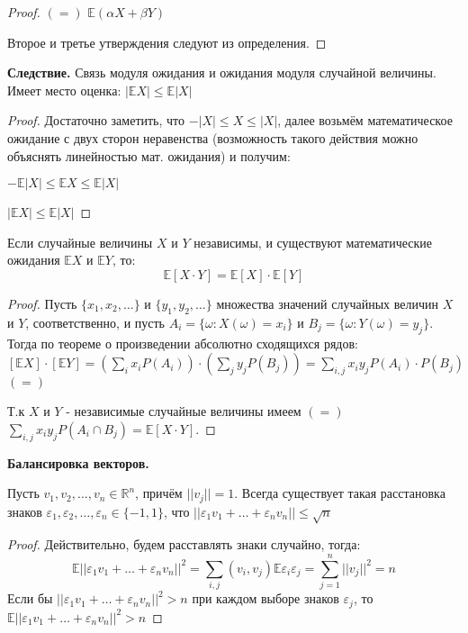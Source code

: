 \documentclass[a4paper]{article}
\begin{document}
\begin{colloq}
\begin{proof}
   		$(=)$ $\mathbb{E}(\alpha X + \beta Y)$
   		
   		Второе и третье утверждения следуют из определения.
   	\end{proof}
   	
   	\textbf{Следствие.} Связь модуля ожидания и ожидания модуля случайной величины. \\
   		Имеет место оценка: $|\mathbb{E}X| \leqslant \mathbb{E}|X|$
   	\begin{proof}
   		Достаточно заметить, что $-|X|\leqslant X \leqslant |X|$, далее возьмём математическое ожидание с двух сторон неравенства (возможность такого действия можно объяснять линейностью мат. ожидания) и получим:
   		 
   		$-\mathbb{E}|X| \leqslant \mathbb{E}X \leqslant \mathbb{E}|X|$
   		
		$|\mathbb{E}X| \leqslant \mathbb{E}|X|$
   	\end{proof}
   	
   	\begin{theorem*}
   		Если случайные величины $X$ и $Y$ независимы, и существуют математические ожидания $\mathbb{E}X$ и $\mathbb{E}Y$, то: \[ \mathbb{E}[X \cdot Y] = \mathbb{E}[X] \cdot \mathbb{E}[Y] \] 
   	\end{theorem*}
   	
   	\begin{proof}
   		Пусть $\{ x_1, x_2, \dots \}$ и $\{ y_1, y_2, \dots \}$ множества значений случайных величин $X$ и $Y$, соответственно, и пусть $A_i=\{ \omega: X(\omega)=x_i \}$ и $B_j=\{ \omega: Y(\omega)=y_j \}$. Тогда по теореме о произведении абсолютно сходящихся рядов: $[\mathbb{E}X] \cdot [\mathbb{E}Y] = \left( \sum_{i} x_i P(A_i) \right) \cdot \left( \sum_{j} y_j P(B_j) \right) = \sum_{i,j} x_i y_j P(A_i) \cdot P(B_j)$ $(=)$ 
   		
   		Т.к $X$ и $Y$ - независимые случайные величины имеем $(=)$ $\sum_{i,j} x_i y_j P(A_i \cap B_j) = \mathbb{E}[X \cdot Y]$.
   	\end{proof}
   	
   	\textbf{Балансировка векторов.}
   	
   	Пусть $v_1, v_2, \dots, v_n \in \mathbb{R}^n$, причём $||v_j|| = 1$. Всегда существует такая расстановка знаков $\varepsilon_1, \varepsilon_2, \dots, \varepsilon_n \in \{ -1, 1 \}$, что $||\varepsilon_1 v_1 + \dots + \varepsilon_n v_n|| \leqslant \sqrt{n}$
   
   	\begin{proof}
   		Действительно, будем расставлять знаки случайно, тогда:
   		\[ \mathbb{E}||\varepsilon_1 v_1 + \dots + \varepsilon_n v_n||^2=\sum_{i, j} (v_i, v_j) \mathbb{E}\varepsilon_i \varepsilon_j = \sum_{j=1}^{n}||v_j||^2 = n \]
   		Если бы $||\varepsilon_1 v_1 + \dots + \varepsilon_n v_n||^2 > n$ при каждом выборе знаков $\varepsilon_j$, то $\mathbb{E}||\varepsilon_1 v_1 + \dots + \varepsilon_n v_n||^2 > n$
   	\end{proof}
   	

\end{colloq}
\end{document}
